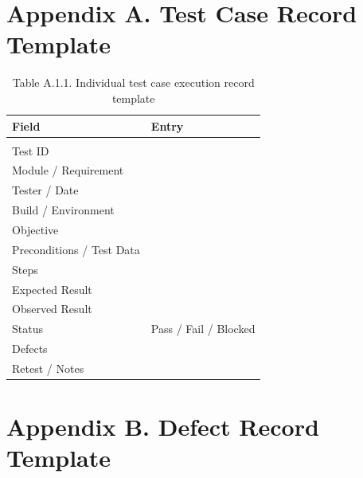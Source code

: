 \clearpage
\section{Appendix A. Test Case Record Template}\label{appendix-a.-test-case-record-template}

{\def\LTcaptype{none} %
\begin{longtable}[]{|
  >{\raggedright\arraybackslash}m{}|
  >{\raggedright\arraybackslash}m{}|}
\hline
\begin{minipage}[c]{\linewidth}\raggedright
\textbf{Field}
\end{minipage} & \begin{minipage}[c]{\linewidth}\raggedright
\textbf{Entry}
\end{minipage} \\
\hline
\endhead

\caption*{Table A.1.1. Individual test case execution record template}\\
\endlastfoot
Test ID & \\ \hline
Module / Requirement & \\ \hline
Tester / Date & \\ \hline
Build / Environment & \\ \hline
Objective & \\ \hline
Preconditions / Test Data & \\ \hline
Steps & \\ \hline
Expected Result & \\ \hline
Observed Result & \\ \hline
Status & Pass / Fail / Blocked \\ \hline
Defects & \\ \hline
Retest / Notes & \\ \hline
\end{longtable}
}

\clearpage
\section{Appendix B. Defect Record Template}\label{appendix-b.-defect-record-template}

